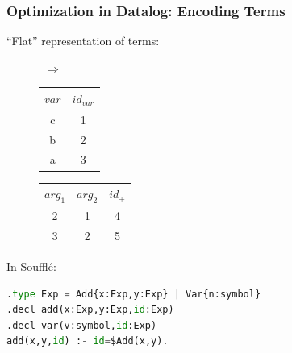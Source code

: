 \documentclass{beamer}
\begin{document}
\begin{frame}[fragile]
    \frametitle{Optimization in Datalog: Encoding Terms}
    ``Flat'' representation of terms:
    \begin{figure}
        \, $\Rightarrow$ \,%
        \begin{tabular}{ c c }
            $var$ & $id_{var}$ \\
            \hline
             c & 1 \\ 
             b & 2\\
             a & 3
        \end{tabular}
        \quad
        \begin{tabular}{ c c c }
        $arg_1$ & $arg_2$ & $id_+$ \\
        \hline
            2 & 1 & 4\\ 
            3 & 2 & 5
        \end{tabular}
    \end{figure} %
    \pause

    In Souffl\'e:
    \begin{lstlisting}[language=Python]
.type Exp = Add{x:Exp,y:Exp} | Var{n:symbol}
.decl add(x:Exp,y:Exp,id:Exp)
.decl var(v:symbol,id:Exp)
add(x,y,id) :- id=$Add(x,y).
    \end{lstlisting}
\end{frame}
\end{document}
